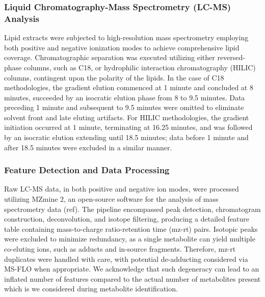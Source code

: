 \documentclass[10pt,letterpaper]{article}
\begin{document}
\subsubsection*{Liquid Chromatography-Mass Spectrometry (LC-MS) Analysis}
Lipid extracts were subjected to high-resolution mass spectrometry employing both positive and negative ionization modes to achieve comprehensive lipid coverage. Chromatographic separation was executed utilizing either reversed-phase columns, such as C18, or hydrophilic interaction chromatography (HILIC) columns, contingent upon the polarity of the lipids. In the case of C18 methodologies, the gradient elution commenced at 1 minute and concluded at 8 minutes, succeeded by an isocratic elution phase from 8 to 9.5 minutes. Data preceding 1 minute and subsequent to 9.5 minutes were omitted to eliminate solvent front and late eluting artifacts. For HILIC methodologies, the gradient initiation occurred at 1 minute, terminating at 16.25 minutes, and was followed by an isocratic elution extending until 18.5 minutes; data before 1 minute and after 18.5 minutes were excluded in a similar manner.

\subsubsection*{Feature Detection and Data Processing}
Raw LC-MS data, in both positive and negative ion modes, were processed utilizing MZmine 2, an open-source software for the analysis of mass spectrometry data (ref). The pipeline encompassed peak detection, chromatogram construction, deconvolution, and isotope filtering, producing a detailed feature table containing mass-to-charge ratio-retention time (mz-rt) pairs. Isotopic peaks were excluded to minimize redundancy, as a single metabolite can yield multiple co-eluting ions, such as adducts and in-source fragments. Therefore, mz-rt duplicates were handled with care, with potential de-adducting considered via MS-FLO when appropriate. We acknowledge that such degeneracy can lead to an inflated number of features compared to the actual number of metabolites present which is we considered during metabolite identification. 
\end{document}
